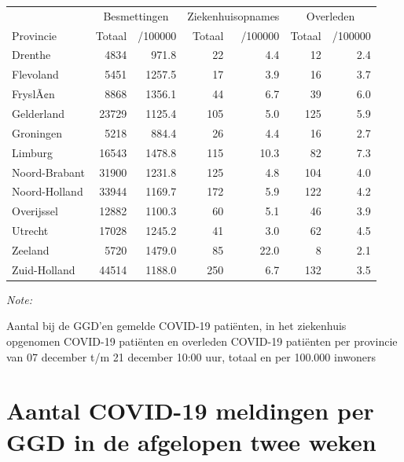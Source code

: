 \documentclass[
  english,
  man,floatsintext]{apa6}
\begin{document}
\begin{table}
\centering
\begin{threeparttable}
\begin{tabular}{lrrrrrr}
\toprule
\multicolumn{1}{c}{ } & \multicolumn{2}{c}{Besmettingen} & \multicolumn{2}{c}{Ziekenhuisopnames} & \multicolumn{2}{c}{Overleden} \\
\cmidrule(l{3pt}r{3pt}){2-3} \cmidrule(l{3pt}r{3pt}){4-5} \cmidrule(l{3pt}r{3pt}){6-7}
Provincie & Totaal & /100000 & Totaal & /100000 & Totaal & /100000\\
\midrule
Drenthe & 4834 & 971.8 & 22 & 4.4 & 12 & 2.4\\
Flevoland & 5451 & 1257.5 & 17 & 3.9 & 16 & 3.7\\
FryslÃ¢n & 8868 & 1356.1 & 44 & 6.7 & 39 & 6.0\\
Gelderland & 23729 & 1125.4 & 105 & 5.0 & 125 & 5.9\\
Groningen & 5218 & 884.4 & 26 & 4.4 & 16 & 2.7\\
Limburg & 16543 & 1478.8 & 115 & 10.3 & 82 & 7.3\\
Noord-Brabant & 31900 & 1231.8 & 125 & 4.8 & 104 & 4.0\\
Noord-Holland & 33944 & 1169.7 & 172 & 5.9 & 122 & 4.2\\
Overijssel & 12882 & 1100.3 & 60 & 5.1 & 46 & 3.9\\
Utrecht & 17028 & 1245.2 & 41 & 3.0 & 62 & 4.5\\
Zeeland & 5720 & 1479.0 & 85 & 22.0 & 8 & 2.1\\
Zuid-Holland & 44514 & 1188.0 & 250 & 6.7 & 132 & 3.5\\
\bottomrule
\end{tabular}
\begin{tablenotes}
\item \textit{Note: } 
\item Aantal bij de GGD’en gemelde COVID-19 patiënten, in het ziekenhuis opgenomen COVID-19 patiënten en overleden COVID-19 patiënten per provincie van 07 december t/m 21 december 10:00 uur, totaal en per 100.000 inwoners
\end{tablenotes}
\end{threeparttable}
\end{table}

\newpage

\hypertarget{aantal-covid-19-meldingen-per-ggd-in-de-afgelopen-twee-weken}{%
\section{Aantal COVID-19 meldingen per GGD in de afgelopen twee weken}\label{aantal-covid-19-meldingen-per-ggd-in-de-afgelopen-twee-weken}}
\end{document}
